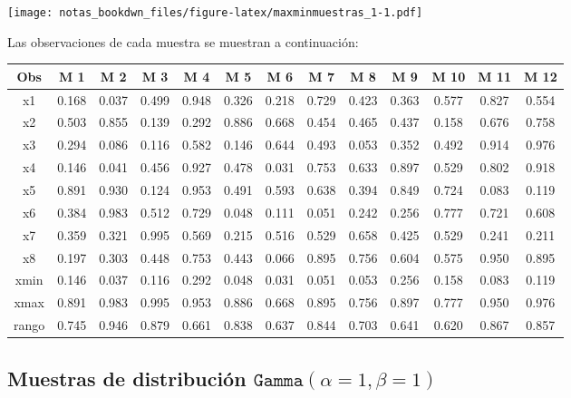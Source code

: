 \documentclass[]{book}
\begin{document}
\texttt{[image: notas\_bookdwn\_files/figure-latex/maxminmuestras\_1-1.pdf]}

Las observaciones de cada muestra se muestran a continuación:

\begin{tabular}{c|c|c|c|c|c|c|c|c|c|c|c|c}
\hline
Obs & M 1 & M 2 & M 3 & M 4 & M 5 & M 6 & M 7 & M 8 & M 9 & M 10 & M 11 & M 12\\
\hline
x1 & 0.168 & 0.037 & 0.499 & 0.948 & 0.326 & 0.218 & 0.729 & 0.423 & 0.363 & 0.577 & 0.827 & 0.554\\
\hline
x2 & 0.503 & 0.855 & 0.139 & 0.292 & 0.886 & 0.668 & 0.454 & 0.465 & 0.437 & 0.158 & 0.676 & 0.758\\
\hline
x3 & 0.294 & 0.086 & 0.116 & 0.582 & 0.146 & 0.644 & 0.493 & 0.053 & 0.352 & 0.492 & 0.914 & 0.976\\
\hline
x4 & 0.146 & 0.041 & 0.456 & 0.927 & 0.478 & 0.031 & 0.753 & 0.633 & 0.897 & 0.529 & 0.802 & 0.918\\
\hline
x5 & 0.891 & 0.930 & 0.124 & 0.953 & 0.491 & 0.593 & 0.638 & 0.394 & 0.849 & 0.724 & 0.083 & 0.119\\
\hline
x6 & 0.384 & 0.983 & 0.512 & 0.729 & 0.048 & 0.111 & 0.051 & 0.242 & 0.256 & 0.777 & 0.721 & 0.608\\
\hline
x7 & 0.359 & 0.321 & 0.995 & 0.569 & 0.215 & 0.516 & 0.529 & 0.658 & 0.425 & 0.529 & 0.241 & 0.211\\
\hline
x8 & 0.197 & 0.303 & 0.448 & 0.753 & 0.443 & 0.066 & 0.895 & 0.756 & 0.604 & 0.575 & 0.950 & 0.895\\
\hline
xmin & 0.146 & 0.037 & 0.116 & 0.292 & 0.048 & 0.031 & 0.051 & 0.053 & 0.256 & 0.158 & 0.083 & 0.119\\
\hline
xmax & 0.891 & 0.983 & 0.995 & 0.953 & 0.886 & 0.668 & 0.895 & 0.756 & 0.897 & 0.777 & 0.950 & 0.976\\
\hline
rango & 0.745 & 0.946 & 0.879 & 0.661 & 0.838 & 0.637 & 0.844 & 0.703 & 0.641 & 0.620 & 0.867 & 0.857\\
\hline
\end{tabular}

\hypertarget{muestras-de-distribuciuxf3n-textttgamma-alpha-1-beta-1}{%
\subsection{\texorpdfstring{Muestras de distribución \(\texttt{Gamma} (\alpha = 1, \beta = 1)\)}{Muestras de distribución \textbackslash{}texttt\{Gamma\} (\textbackslash{}alpha = 1, \textbackslash{}beta = 1)}}\label{muestras-de-distribuciuxf3n-textttgamma-alpha-1-beta-1}}
\end{document}
